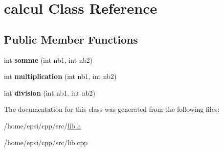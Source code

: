 \hypertarget{classcalcul}{}\section{calcul Class Reference}
\label{classcalcul}
\subsection*{Public Member Functions}
\begin{DoxyCompactItemize}
\item 
\mbox{\label{classcalcul_aaab5926fb2fc504a256b9a91a3111875}} 
int {\bfseries somme} (int nb1, int nb2)
\item 
\mbox{\label{classcalcul_ac2c97fc5ca00ae17dcf9e6c16eb20a69}} 
int {\bfseries multiplication} (int nb1, int nb2)
\item 
\mbox{\label{classcalcul_a0325365b6b491fda5ae7b78fc385f22c}} 
int {\bfseries division} (int nb1, int nb2)
\end{DoxyCompactItemize}


The documentation for this class was generated from the following files\+:\begin{DoxyCompactItemize}
\item 
/home/epsi/cpp/src/\hyperlink{lib_8h}{lib.\+h}\item 
/home/epsi/cpp/src/lib.\+cpp\end{DoxyCompactItemize}
